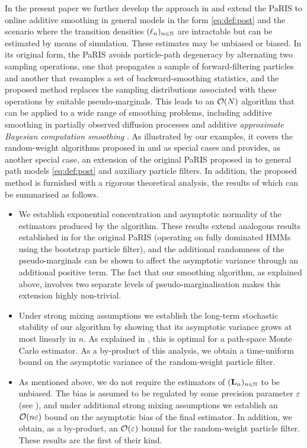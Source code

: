 In the present paper we further develop the approach in \cite{gloaguen2018online} and extend the PaRIS to online additive smoothing in general models in the form \eqref{eq:def:post} and the scenario where the transition densities $(\ell_{n})_{n \in \mathbb{N}}$ are intractable but can be estimated by means of simulation. These estimates may be unbiased or biased. In its original form, the PaRIS avoids particle-path degeneracy by alternating two sampling operations, one that propagates a sample of forward-filtering particles and another that resamples a set of backward-smoothing statistics, and the proposed method replaces the sampling distributions associated with these operations by suitable pseudo-marginals. This leads to an $\mathcal{O}(N)$ algorithm that can be applied to a wide range of smoothing problems, including additive smoothing in partially observed diffusion processes and additive \emph{approximate Bayesian computation smoothing} \cite{martin:jasra:singh:whiteley:delmoral:maccoy:2014}. As illustrated by our examples, it covers the random-weight algorithms proposed in \cite{fearnhead2008particle} and \cite{gloaguen2018online} as special cases and provides, as another special case, an extension of the original PaRIS proposed in \cite{olsson:westerborn:2014b} to general path models \eqref{eq:def:post} and auxiliary particle filters. In addition, the proposed method is furnished with a rigorous theoretical analysis, the results of which can be summarised as follows. 

\begin{itemize}
\item We establish exponential concentration and asymptotic normality of the estimators produced by the algorithm. These results extend analogous results established in \cite{olsson:westerborn:2014b} for the original PaRIS (operating on fully dominated HMMs using the bootstrap particle filter), and the additional randomness of the pseudo-marginals can be shown to affect the asymptotic variance through an additional positive term. The fact that our smoothing algorithm, as explained above, involves two separate levels of pseudo-marginalisation makes this extension highly non-trivial. 
\item Under strong mixing assumptions we establish the long-term stochastic stability of our algorithm by showing that its asymptotic variance grows at most linearly in $n$. As explained in \cite[Section~1]{olsson:westerborn:2014b}, this is optimal for a path-space Monte Carlo estimator. As a by-product of this analysis, we obtain a time-uniform bound on the asymptotic variance of the random-weight particle filter. 
\item As mentioned above, we do not require the estimators of $(\mathbf{L}_{n})_{n \in \mathbb{N}}$ to be unbiased. The bias is assumed to be regulated by some precision parameter $\varepsilon$ (see ), and under additional strong mixing assumptions we establish an $\mathcal{O}(n \varepsilon)$ bound on the asymptotic bias of the final estimator. In addition, we obtain, as a by-product, an $\mathcal{O}(\varepsilon)$ bound for the random-weight particle filter. These results are the first of their kind.   
\end{itemize}

